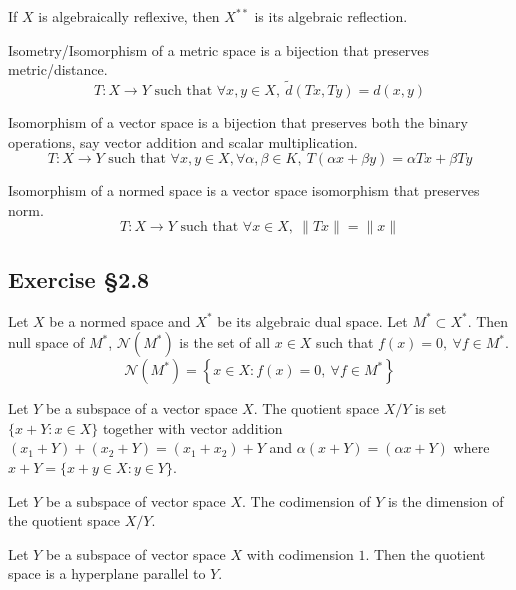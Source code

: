 \begin{remark}
	If $X$ is algebraically reflexive, then $X^{\ast\ast}$ is its algebraic reflection.
\end{remark}

\begin{definition}[isomorphism]
	Isometry/Isomorphism of a metric space is a bijection that preserves metric/distance.
	\[ T : X \to Y \text{ such that } \forall x,y \in X,\ \tilde{d}(Tx,Ty) = d(x,y) \]

	Isomorphism of a vector space is a bijection that preserves both the binary operations, say vector addition and scalar multiplication.
	\[ T : X \to Y \text{ such that } \forall x,y \in X, \forall \alpha,\beta \in K,\ T(\alpha x + \beta y) = \alpha Tx + \beta Ty \]

	Isomorphism of a normed space is a vector space isomorphism that preserves norm.
	\[ T : X \to Y \text{ such that } \forall x \in X,\ \| Tx \| = \| x \| \]
\end{definition}

\subsection*{Exercise \S2.8}
\begin{definition}
	Let $X$ be a normed space and $X^\ast$ be its algebraic dual space.
	Let $M^\ast \subset X^\ast$.
	Then null space of $M^\ast$, $\mathcal{N}(M^\ast)$ is the set of all $x \in X$ such that $f(x) = 0,\ \forall f \in M^\ast$.
	\[ \mathcal{N}(M^\ast) = \left\{ x \in X : f(x) = 0,\ \forall f \in M^\ast \right\} \]
\end{definition}

\begin{definition}
	Let $Y$ be a subspace of a vector space $X$.
	The quotient space $X/Y$ is set $\{ x+Y : x \in X \}$ together with vector addition $(x_1+Y)+(x_2+Y) = (x_1+x_2)+Y$ and $\alpha(x+Y) = (\alpha x + Y)$ where $x+Y = \{ x+y \in X : y \in Y \}$.
\end{definition}
\begin{definition}[codimension]
	Let $Y$ be a subspace of vector space $X$.
	The codimension of $Y$ is the dimension of the quotient space $X/Y$.
\end{definition}

\begin{definition}[hyperplane]
	Let $Y$ be a subspace of vector space $X$ with codimension $1$.
	Then the quotient space is a hyperplane parallel to $Y$.
\end{definition}

